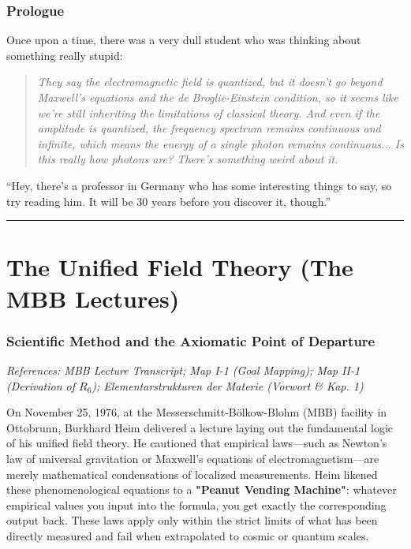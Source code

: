 \documentclass[11pt,a4paper,oneside]{article}
\newenvironment{fancyquote}
    {\begin{quote}\itshape\color{theoryblue!80!black}\guillemotleft\;}
    {\;\guillemotright\end{quote}}
\newcommand{\hr}{\par\vspace{2em}\noindent\rule{\linewidth}{0.4pt}\par\vspace{2em}}
\begin{document}
\section*{Prologue}

Once upon a time, there was a very dull student who was thinking about something really stupid:

\begin{fancyquote}
    They say the electromagnetic field is quantized, but it doesn't go beyond Maxwell's equations and the de Broglie-Einstein condition, so it seems like we're still inheriting the limitations of classical theory. And even if the amplitude is quantized, the frequency spectrum remains continuous and infinite, which means the energy of a single photon remains continuous... Is this really how photons are? There's something weird about it.
\end{fancyquote}

\noindent ``Hey, there's a professor in Germany who has some interesting things to say, so try reading him. It will be 30 years before you discover it, though.''

\hr

\clearpage
\part{The Unified Field Theory (The MBB Lectures)}


\section{Scientific Method and the Axiomatic Point of Departure}
\label{sec:mbb_intro}

\textit{References: MBB Lecture Transcript; Map I-1 (Goal Mapping); Map II-1 (Derivation of $R_6$); Elementarstrukturen der Materie (Vorwort \& Kap. 1)}

On November 25, 1976, at the Messerschmitt-Bölkow-Blohm (MBB) facility in Ottobrunn, Burkhard Heim delivered a lecture laying out the fundamental logic of his unified field theory. He cautioned that empirical laws—such as Newton's law of universal gravitation or Maxwell's equations of electromagnetism—are merely mathematical condensations of localized measurements. Heim likened these phenomenological equations to a \textbf{"Peanut Vending Machine"}: whatever empirical values you input into the formula, you get exactly the corresponding output back. These laws apply only within the strict limits of what has been directly measured and fail when extrapolated to cosmic or quantum scales.
\end{document}

